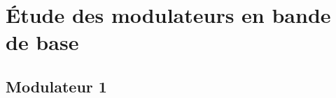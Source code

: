 \documentclass{article}
\begin{document}
\section{Étude des modulateurs en bande de base}

\subsection{Modulateur 1}
\end{document}
